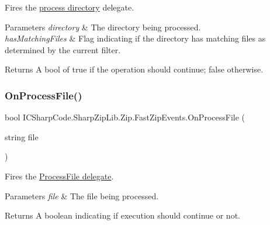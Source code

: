 Fires the \hyperlink{class_i_c_sharp_code_1_1_sharp_zip_lib_1_1_zip_1_1_fast_zip_events_a159a89c479511187e4c989ae149796af}{process directory} delegate. 


\begin{DoxyParams}{Parameters}
{\em directory} & The directory being processed.\\
\hline
{\em has\+Matching\+Files} & Flag indicating if the directory has matching files as determined by the current filter.\\
\hline
\end{DoxyParams}
\begin{DoxyReturn}{Returns}
A bool of true if the operation should continue; false otherwise.
\end{DoxyReturn}
\mbox{\label{class_i_c_sharp_code_1_1_sharp_zip_lib_1_1_zip_1_1_fast_zip_events_a82c21c7003b64f14420145dd4f41db46}} 
\subsubsection{\texorpdfstring{On\+Process\+File()}{OnProcessFile()}}
{\footnotesize\ttfamily bool I\+C\+Sharp\+Code.\+Sharp\+Zip\+Lib.\+Zip.\+Fast\+Zip\+Events.\+On\+Process\+File (\begin{DoxyParamCaption}\item[{string}]{file }\end{DoxyParamCaption})\hspace{0.3cm}{\ttfamily [inline]}}



Fires the \hyperlink{class_i_c_sharp_code_1_1_sharp_zip_lib_1_1_zip_1_1_fast_zip_events_a3dd9d1b4b6453229cc18b2899ab43788}{Process\+File delegate}. 


\begin{DoxyParams}{Parameters}
{\em file} & The file being processed.\\
\hline
\end{DoxyParams}
\begin{DoxyReturn}{Returns}
A boolean indicating if execution should continue or not.
\end{DoxyReturn}


